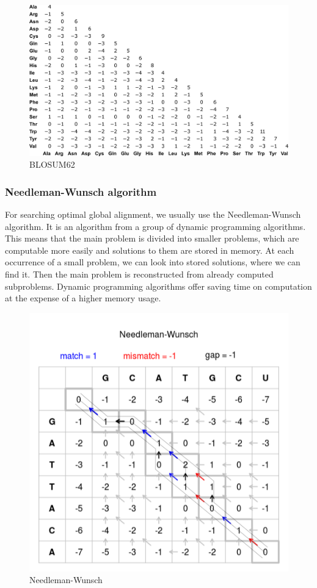 \begin{figure}[ht]
  \centering
	\includegraphics[width=\textwidth]{./images/blosum62.png}
  \caption{BLOSUM62}
  \label{fig:blosum}
\end{figure}


\subsubsection{Needleman-Wunsch algorithm}
For searching optimal global alignment, we usually use the Needleman-Wunsch algorithm.
It is an algorithm from a group of dynamic programming algorithms.
This means that the main problem is divided into smaller problems, which are computable more easily and solutions to them are stored in memory.
At each occurrence of a small problem, we can look into stored solutions, where we can find it.
Then the main problem is reconstructed from already computed subproblems.
Dynamic programming algorithms offer saving time on computation at the expense of a higher memory usage.

\begin{figure}[ht]
  \centering
	\includegraphics[width=\textwidth]{./images/needle_wunsch.png}
  \caption{Needleman-Wunsch}
  \label{fig:glal}
\end{figure}

